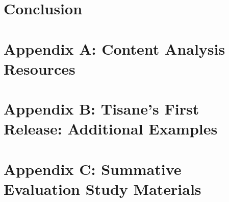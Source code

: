 \documentclass[11pt]{book}
\begin{document}
\chapter{Conclusion}
\label{chapter:conclusion}


\clearpage
{}
\singlespacing



\newpage
\newcommand{\beginsupplement}{%
    \setcounter{chapter}{0}
    \renewcommand{\thechapter}{\Alph{chapter}}%
 }

\appendix
\beginsupplement
\chapter{Appendix A: Content Analysis Resources}
\label{chapter:appHypoForm}


\chapter{Appendix B: Tisane's First Release: Additional Examples}
\label{chapter:appTisane}



\chapter{Appendix C: Summative Evaluation Study Materials}
\label{chapter:apprTisane} %

\end{document}
